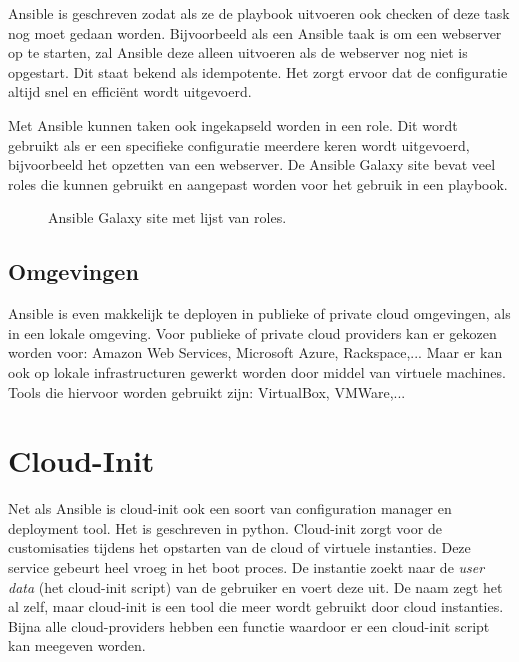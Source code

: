 Ansible is geschreven zodat als ze de playbook uitvoeren ook checken of deze task nog moet gedaan worden. Bijvoorbeeld als een Ansible taak is om een webserver op te starten, zal Ansible deze alleen uitvoeren als de webserver nog niet is opgestart. Dit staat bekend als idempotente. Het zorgt ervoor dat de configuratie altijd snel en efficiënt wordt uitgevoerd.

Met Ansible kunnen taken ook ingekapseld worden in een role. Dit wordt gebruikt als er een specifieke configuratie meerdere keren wordt uitgevoerd, bijvoorbeeld het opzetten van een webserver. De Ansible Galaxy site bevat veel roles die kunnen gebruikt en aangepast worden voor het gebruik in een playbook.
\begin{figure}[!htb]
    \caption{Ansible Galaxy site met lijst van roles.}
    \label{fig:agalaxy}
\end{figure}


\subsection{Omgevingen}
Ansible is even makkelijk te deployen in publieke of private cloud omgevingen, als in een lokale omgeving. Voor publieke of private cloud providers kan er gekozen worden voor: Amazon Web Services, Microsoft Azure, Rackspace,... Maar er kan ook op lokale infrastructuren gewerkt worden door middel van virtuele machines. Tools die hiervoor worden gebruikt zijn: VirtualBox, VMWare,...

\section{Cloud-Init}
Net als Ansible is cloud-init ook een soort van configuration manager en deployment tool. Het is geschreven in python. Cloud-init zorgt  voor de customisaties tijdens het opstarten van de cloud of virtuele instanties. Deze service gebeurt heel vroeg in het boot proces. De instantie zoekt naar de \textit{user data} (het cloud-init script) van de gebruiker en voert deze uit. De naam zegt het al zelf, maar cloud-init is een tool die meer wordt gebruikt door cloud instanties. Bijna alle cloud-providers hebben een functie waardoor er een cloud-init script kan meegeven worden. 

